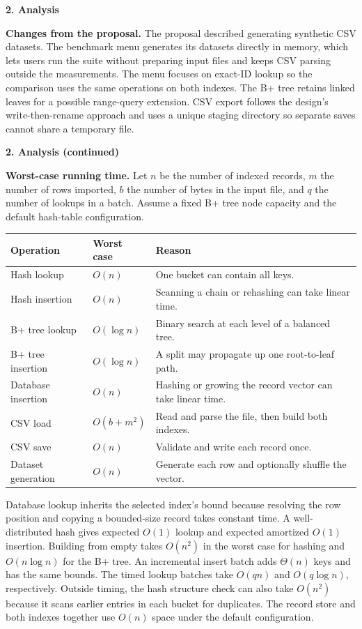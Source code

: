 \documentclass[12pt,letterpaper]{article}
\newcommand{\heading}[1]{\par\addvspace{10pt}\noindent\textbf{#1}\par\nobreak}
\begin{document}
\heading{2. Analysis}

\textbf{Changes from the proposal.}
The proposal described generating synthetic CSV datasets. The benchmark menu
generates its datasets directly in memory, which lets users run the suite
without preparing input files and keeps CSV parsing outside the measurements.
The menu focuses on exact-ID lookup so the comparison uses the same operations
on both indexes. The B+ tree retains linked leaves for a possible range-query
extension. CSV export follows the design's write-then-rename approach and uses
a unique staging directory so separate saves cannot share a temporary file.

\newpage
\heading{2. Analysis (continued)}

\textbf{Worst-case running time.}
Let $n$ be the number of indexed records, $m$ the number of rows imported, $b$ the
number of bytes in the input file, and $q$ the number of lookups in a batch.
Assume a fixed B+ tree node capacity and the default hash-table configuration.

\begin{tabularx}{\linewidth}{@{}l l X@{}}
\toprule
\textbf{Operation} & \textbf{Worst case} & \textbf{Reason}\\
\midrule
Hash lookup & $O(n)$ & One bucket can contain all keys.\\
Hash insertion & $O(n)$ & Scanning a chain or rehashing can take linear time.\\
B+ tree lookup & $O(\log n)$ & Binary search at each level of a balanced tree.\\
B+ tree insertion & $O(\log n)$ & A split may propagate up one root-to-leaf path.\\
Database insertion & $O(n)$ & Hashing or growing the record vector can take linear time.\\
CSV load & $O(b+m^2)$ & Read and parse the file, then build both indexes.\\
CSV save & $O(n)$ & Validate and write each record once.\\
Dataset generation & $O(n)$ & Generate each row and optionally shuffle the vector.\\
\bottomrule
\end{tabularx}

Database lookup inherits the selected index's bound because resolving the row
position and copying a bounded-size record takes constant time. A well-distributed
hash gives expected $O(1)$ lookup and expected amortized $O(1)$ insertion.
Building from empty takes $O(n^2)$ in the worst case for hashing and
$O(n\log n)$ for the B+ tree. An incremental insert batch adds $\Theta(n)$ keys
and has the same bounds. The timed lookup batches take $O(qn)$ and
$O(q\log n)$, respectively. Outside timing, the hash structure check can also
take $O(n^2)$ because it scans earlier entries in each bucket for duplicates.
The record store and both indexes together use $O(n)$ space under the default
configuration.
\end{document}
